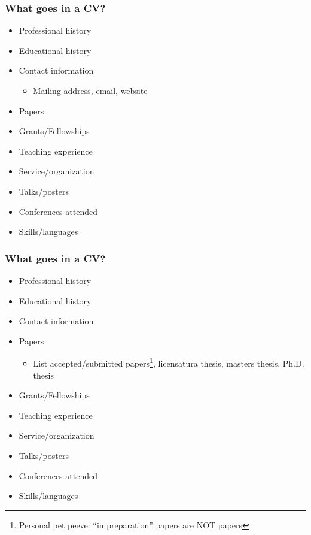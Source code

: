 \documentclass{beamer}
\begin{document}
\begin{frame}\frametitle{What goes in a CV?}

\begin{itemize}
	\item Professional history
	\item Educational history
	\item Contact information
	\begin{itemize}
		\item Mailing address, email, website
	\end{itemize}
	\item Papers
	\item Grants/Fellowships
	\item Teaching experience
	\item Service/organization
	\item Talks/posters
	\item Conferences attended
	\item Skills/languages
\end{itemize}

\end{frame}

\begin{frame}\frametitle{What goes in a CV?}

\begin{itemize}
	\item Professional history
	\item Educational history
	\item Contact information
	\item Papers	
	\begin{itemize}
		\item List accepted/submitted papers\footnote{Personal pet peeve: ``in preparation'' papers are NOT papers}, licensatura thesis, masters thesis, Ph.D. thesis
	\end{itemize}
	\item Grants/Fellowships
	\item Teaching experience
	\item Service/organization
	\item Talks/posters
	\item Conferences attended
	\item Skills/languages
\end{itemize}

\end{frame}
\end{document}
